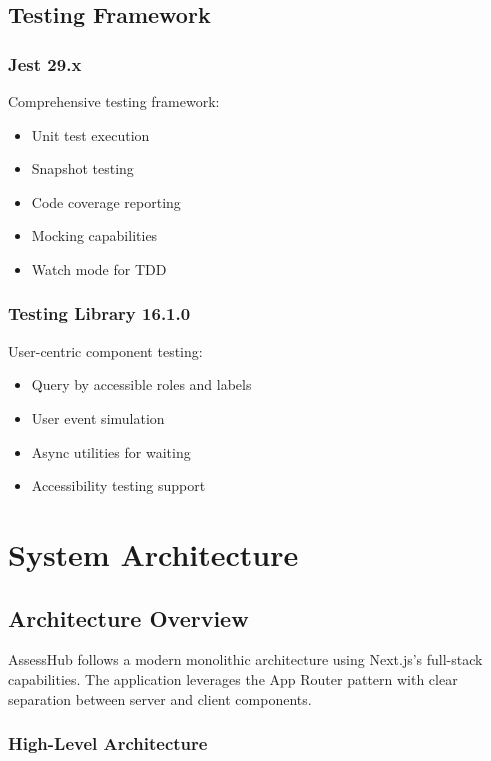 \documentclass[12pt,a4paper]{report}
\begin{document}
\section{Testing Framework}

\subsection{Jest 29.x}

Comprehensive testing framework:

\begin{itemize}
    \item Unit test execution
    \item Snapshot testing
    \item Code coverage reporting
    \item Mocking capabilities
    \item Watch mode for TDD
\end{itemize}

\subsection{Testing Library 16.1.0}

User-centric component testing:

\begin{itemize}
    \item Query by accessible roles and labels
    \item User event simulation
    \item Async utilities for waiting
    \item Accessibility testing support
\end{itemize}

\chapter{System Architecture}

\section{Architecture Overview}

AssessHub follows a modern monolithic architecture using Next.js's full-stack capabilities. The application leverages the App Router pattern with clear separation between server and client components.

\subsection{High-Level Architecture}
\end{document}
